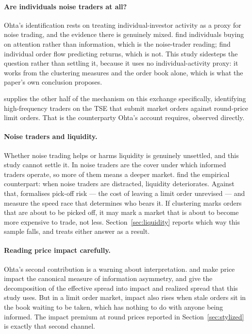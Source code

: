 \paragraph{Are individuals noise traders at all?}
Ohta's identification rests on treating individual-investor activity as a proxy
for noise trading, and the evidence there is genuinely mixed.
\textcite{BarberOdean2008} find individuals buying on attention rather than
information, which is the noise-trader reading;
\textcite{KanielSaarTitman2008} find individual order flow predicting returns,
which is not. This study sidesteps the question rather than settling it, because
it uses no individual-activity proxy: it works from the clustering measures and
the order book alone, which is what the paper's own conclusion proposes.

\textcite{Yamada2023HFT} supplies the other half of the mechanism on this
exchange specifically, identifying high-frequency traders on the TSE that submit
market orders against round-price limit orders. That is the counterparty Ohta's
account requires, observed directly.

\paragraph{Noise traders and liquidity.}
Whether noise trading helps or harms liquidity is genuinely unsettled, and this
study cannot settle it. In \textcite{Kyle1985} noise traders are the cover under
which informed traders operate, so more of them means a deeper market.
\textcite{PeressSchmidt2020} find the empirical counterpart: when noise traders
are distracted, liquidity deteriorates. Against that,
\textcite{Foucault1999} formalises pick-off risk --- the cost of leaving a limit
order unrevised --- and \textcite{AquilinaBudishONeill2022} measure the speed
race that determines who bears it. If clustering marks orders that are about to
be picked off, it may mark a market that is about to become more expensive to
trade, not less. Section~\ref{sec:liquidity} reports which way this sample
falls, and treats either answer as a result.

\paragraph{Reading price impact carefully.}
Ohta's second contribution is a warning about interpretation.
\textcite{GlostenMilgrom1985} and \textcite{Hasbrouck1991} make price impact the
canonical measure of information asymmetry, and
\textcite{HendershottJonesMenkveld2011} give the decomposition of the effective
spread into impact and realized spread that this study uses. But in a limit order
market, impact also rises when stale orders sit in the book waiting to be taken,
which has nothing to do with anyone being informed. The impact premium at round
prices reported in Section~\ref{sec:stylized} is exactly that second channel.

